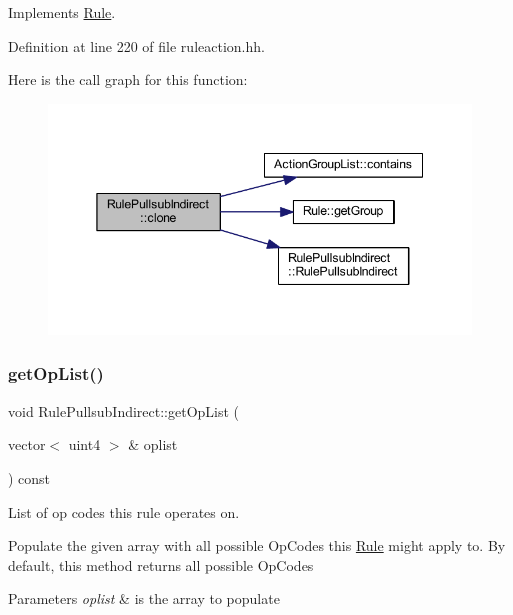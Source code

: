 Implements \mbox{\hyperlink{class_rule_a70de90a76461bfa7ea0b575ce3c11e4d}{Rule}}.



Definition at line 220 of file ruleaction.\+hh.

Here is the call graph for this function\+:
\nopagebreak
\begin{figure}[H]
\begin{center}
\leavevmode
\includegraphics[width=345pt]{class_rule_pullsub_indirect_a6ad44519f0a5f0bd74d31aed1facae02_cgraph}
\end{center}
\end{figure}
\mbox{\label{class_rule_pullsub_indirect_a08b3e95c2aef200c65231e6d70b3fb4c}} 
\subsubsection{\texorpdfstring{getOpList()}{getOpList()}}
{\footnotesize\ttfamily void Rule\+Pullsub\+Indirect\+::get\+Op\+List (\begin{DoxyParamCaption}\item[{vector$<$ uint4 $>$ \&}]{oplist }\end{DoxyParamCaption}) const\hspace{0.3cm}{\ttfamily [virtual]}}



List of op codes this rule operates on. 

Populate the given array with all possible Op\+Codes this \mbox{\hyperlink{class_rule}{Rule}} might apply to. By default, this method returns all possible Op\+Codes 
\begin{DoxyParams}{Parameters}
{\em oplist} & is the array to populate \\
\hline
\end{DoxyParams}


